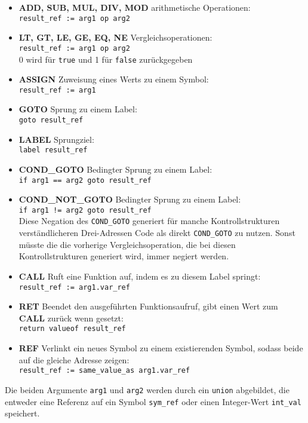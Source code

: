 \begin{itemize}
  \item \textbf{ADD, SUB, MUL, DIV, MOD} arithmetische Operationen: \\ \texttt{result\_ref := arg1 op arg2}
  \item \textbf{LT, GT, LE, GE, EQ, NE} Vergleichsoperationen: \\ \texttt{result\_ref := arg1 op arg2}\\ 0 wird für \texttt{true} und 1 für \texttt{false} zurückgegeben
  \item \textbf{ASSIGN} Zuweisung eines Werts zu einem Symbol: \\ \texttt{result\_ref := arg1}
  \item \textbf{GOTO} Sprung zu einem Label: \\ \texttt{goto result\_ref}
  \item \textbf{LABEL} Sprungziel: \\ \texttt{label result\_ref}
  \item \textbf{COND\_GOTO} Bedingter Sprung zu einem Label: \\ \texttt{if arg1 == arg2 goto result\_ref}
  \item \textbf{COND\_NOT\_GOTO} Bedingter Sprung zu einem Label:\\ \texttt{if arg1 != arg2 goto result\_ref}\\ 
    Diese Negation des \texttt{COND\_GOTO} generiert für manche Kontrollstrukturen verständlicheren Drei-Adressen Code als direkt \texttt{COND\_GOTO} zu nutzen.
    Sonst müsste die die vorherige Vergleichsoperation, die bei diesen Kontrollstrukturen generiert wird, immer negiert werden.
  \item \textbf{CALL} Ruft eine Funktion auf, indem es zu diesem Label springt: \\ \texttt{result\_ref := arg1.var\_ref}
  \item \textbf{RET} Beendet den ausgeführten Funktionsaufruf, gibt einen Wert zum \textbf{CALL} zurück wenn gesetzt: \\ \texttt{return valueof result\_ref}
  \item \textbf{REF} Verlinkt ein neues Symbol zu einem existierenden Symbol, sodass beide auf die gleiche Adresse zeigen: \\ \texttt{result\_ref := same\_value\_as arg1.var\_ref}
\end{itemize}

Die beiden Argumente \texttt{arg1} und \texttt{arg2} werden durch ein \texttt{union} abgebildet, die entweder eine Referenz auf ein Symbol \texttt{sym\_ref} oder einen Integer-Wert \texttt{int\_val} speichert.

